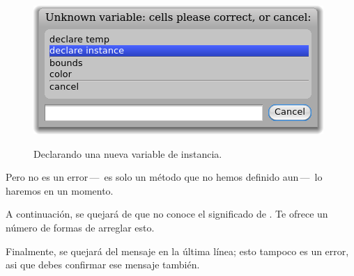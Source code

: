 \documentclass[a4paper,10pt,twoside]{book}
\begin{document}
\begin{figure}[htb]
\begin{minipage}{0.48\textwidth}
		{\includegraphics[scale=0.7]{DeclareInstanceVar}}
	\caption{Declarando una nueva variable de instancia.\figlabel{declareInstance}}
\end{minipage}
\end{figure}

Pero  no es un error\,---\, es solo un m\'etodo que no hemos definido aun\,---\, lo haremos en un momento.


A continuaci\'on, \pharo se quejar\'a de que no conoce el significado de . Te ofrece un n\'umero de formas de arreglar esto. 


Finalmente, \pharo se quejar\'a del mensaje  en la \'ultima l\'inea; esto tampoco es un error, asi que debes confirmar ese mensaje tambi\'en.

\end{document}

